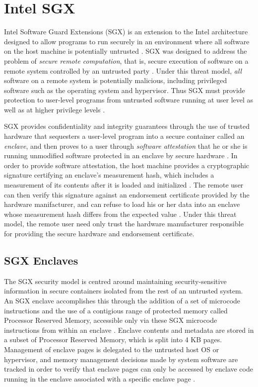 \section{Intel SGX}

Intel Software Guard Extensions (SGX) is an extension to the Intel architecture designed to allow programs to run securely in an environment where all software on the host machine is potentially untrusted \cite{intel_corporation_intel_2016}. SGX was designed to address the problem of \emph{secure remote computation}, that is, secure execution of software on a remote system controlled by an untrusted party \cite{intel_corporation_intel_2016}. Under this threat model, \emph{all} software on a remote system is potentially malicious, including privileged software such as the operating system and hypervisor. Thus SGX must provide protection to user-level programs from untrusted software running at user level as well as at higher privilege levels \cite{costan_intel_2016}. 

SGX provides confidentiality and integrity guarantees through the use of trusted hardware that sequesters a user-level program into a secure container called an \emph{enclave}, and then proves to a user through \emph{software attestation} that he or she is running unmodified software protected in an enclave by secure hardware \cite{intel_corporation_intel_2016}. In order to provide software attestation, the host machine provides a cryptographic signature certifying an enclave's measurement hash, which includes a measurement of its contents after it is loaded and initialized \cite{costan_intel_2016}. The remote user can then verify this signature against an endorsement certificate provided by the hardware manifacturer, and can refuse to load his or her data into an enclave whose measurement hash differs from the expected value \cite{intel_corporation_intel_2016, costan_intel_2016}. Under this threat model, the remote user need only trust the hardware manufacturer responsible for providing the secure hardware and endorsement certificate.

\subsection{SGX Enclaves}

The SGX security model is centred around maintaining security-sensitive information in secure containers isolated from the rest of an untrusted system. An SGX enclave accomplishes this through the addition of a set of microcode instructions and the use of a contigious range of protected memory called Processor Reserved Memory, accessible only via these SGX microcode instructions from within an enclave \cite{costan_intel_2016}. Enclave contents and metadata are stored in a subset of Processor Reserved Memory, which is split into 4 KB pages. Management of enclave pages is delegated to the untrusted host OS or hypervisor, and memory management decisions made by system software are tracked in order to verify that enclave pages can only be accessed by enclave code running in the enclave associated with a specific enclave page \cite{intel_corporation_intel_2016, costan_intel_2016}. 

